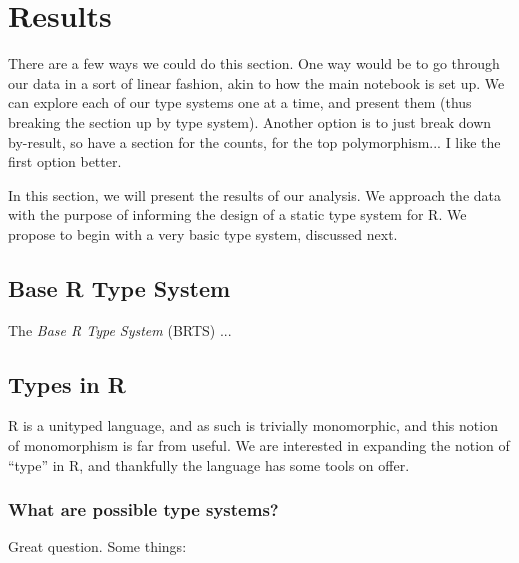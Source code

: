 \documentclass[acmsmall,10pt,review,anonymous]{acmart}\settopmatter{printfolios=true,printccs=false,printacmref=false}
\begin{document}
%
%
%
%
%
%
\section{Results}

 There are a few ways we could do this section.
One way would be to go through our data in a sort of linear fashion, akin to how the main notebook is set up.
We can explore each of our type systems one at a time, and present them (thus breaking the section up by type system).
Another option is to just break down by-result, so have a section for the counts, for the top polymorphism...
I like the first option better.

In this section, we will present the results of our analysis. 
We approach the data with the purpose of informing the design of a static type system for R.
We propose to begin with a very basic type system, discussed next.

\subsection{Base R Type System}

The {\it Base R Type System} (BRTS) ...

%
%
%
%
\subsection{Types in R}


R is a unityped language, and as such is trivially monomorphic, and this notion of monomorphism is far from useful.
We are interested in expanding the notion of ``type'' in R, and thankfully the language has some tools on offer.

%
%
\subsubsection{What are possible type systems?}

Great question.
Some things:
\end{document}
